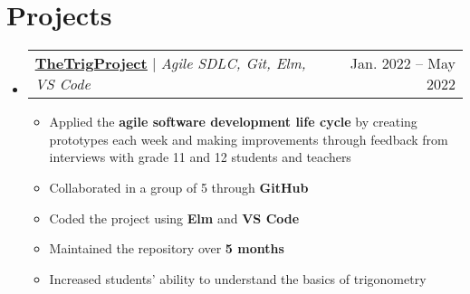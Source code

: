 \documentclass[letterpaper,11pt]{article}
\makeatletter
\newcommand{\resumeItem}[1]{
  \item\small{
    {#1 \vspace{-2pt}}
  }
}
\newcommand{\resumeSubheading}[4]{
  \vspace{-2pt}\item
    \begin{tabular*}{0.97\textwidth}[t]{l@{\extracolsep{\fill}}r}
      \textbf{#1} & #2 \\
      \textit{\small#3} & \textit{\small #4} \\
    \end{tabular*}\vspace{-7pt}
}
\newcommand{\resumeSubSubheading}[2]{
    \item
    \begin{tabular*}{0.97\textwidth}{l@{\extracolsep{\fill}}r}
      \textit{\small#1} & \textit{\small #2} \\
    \end{tabular*}\vspace{-7pt}
}
\newcommand{\resumeProjectHeading}[2]{
    \item
    \begin{tabular*}{0.97\textwidth}{l@{\extracolsep{\fill}}r}
      \small#1 & #2 \\
    \end{tabular*}\vspace{-7pt}
}
\newcommand{\resumeSubHeadingListStart}{\begin{itemize}[leftmargin=0.15in, label={}]}
\newcommand{\resumeSubHeadingListEnd}{\end{itemize}}
\newcommand{\resumeItemListStart}{\begin{itemize}}
\newcommand{\resumeItemListEnd}{\end{itemize}\vspace{-5pt}}
\makeatother
\begin{document}

%
%

\section{Projects}
\resumeSubHeadingListStart
	\resumeProjectHeading{\href{https://github.com/youcefs21/TheTrigProject}{\underline{\textbf{TheTrigProject}}} $|$ \emph{Agile SDLC, Git, Elm, VS Code}}{Jan. 2022 -- May 2022}
	\resumeItemListStart
		\resumeItem{Applied the \textbf{agile software development life cycle} by creating prototypes each week and making improvements through feedback from interviews with grade 11 and 12 students and teachers}
		\resumeItem{Collaborated in a group of 5 through \textbf{GitHub}}
		\resumeItem{Coded the project using \textbf{Elm} and \textbf{VS Code}}
		\resumeItem{Maintained the repository over \textbf{5 months}}
		\resumeItem{Increased students' ability to understand the basics of trigonometry}
	\resumeItemListEnd
\resumeSubHeadingListEnd
\end{document}

